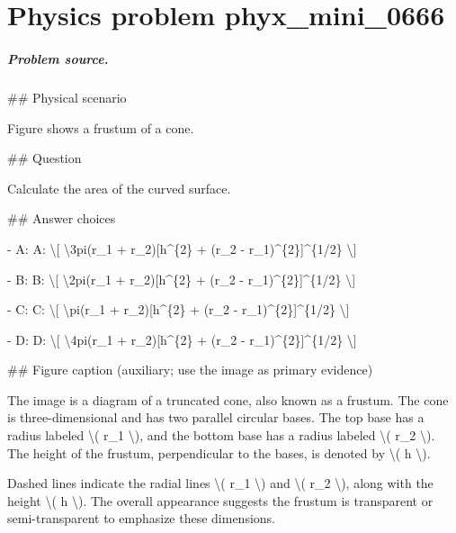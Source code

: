 
\chapter{Physics problem phyx\_mini\_0666}
\label{ch:PhyXMiniProblems_problem_phyx_mini_0666}

\paragraph{Problem source.}
\#\# Physical scenario

Figure shows a frustum of a cone.

\#\# Question

Calculate the area of the curved surface.

\#\# Answer choices

- A: A: \textbackslash{}[ \textbackslash{}3pi(r\_1 + r\_2)[h\textasciicircum{}\{2\} + (r\_2 - r\_1)\textasciicircum{}\{2\}]\textasciicircum{}\{1/2\} \textbackslash{}]

- B: B: \textbackslash{}[ \textbackslash{}2pi(r\_1 + r\_2)[h\textasciicircum{}\{2\} + (r\_2 - r\_1)\textasciicircum{}\{2\}]\textasciicircum{}\{1/2\} \textbackslash{}]

- C: C: \textbackslash{}[ \textbackslash{}pi(r\_1 + r\_2)[h\textasciicircum{}\{2\} + (r\_2 - r\_1)\textasciicircum{}\{2\}]\textasciicircum{}\{1/2\} \textbackslash{}]

- D: D: \textbackslash{}[ \textbackslash{}4pi(r\_1 + r\_2)[h\textasciicircum{}\{2\} + (r\_2 - r\_1)\textasciicircum{}\{2\}]\textasciicircum{}\{1/2\} \textbackslash{}]

\#\# Figure caption (auxiliary; use the image as primary evidence)

The image is a diagram of a truncated cone, also known as a frustum. The cone is three-dimensional and has two parallel circular bases. The top base has a radius labeled \textbackslash{}( r\_1 \textbackslash{}), and the bottom base has a radius labeled \textbackslash{}( r\_2 \textbackslash{}). The height of the frustum, perpendicular to the bases, is denoted by \textbackslash{}( h \textbackslash{}).

Dashed lines indicate the radial lines \textbackslash{}( r\_1 \textbackslash{}) and \textbackslash{}( r\_2 \textbackslash{}), along with the height \textbackslash{}( h \textbackslash{}). The overall appearance suggests the frustum is transparent or semi-transparent to emphasize these dimensions.

